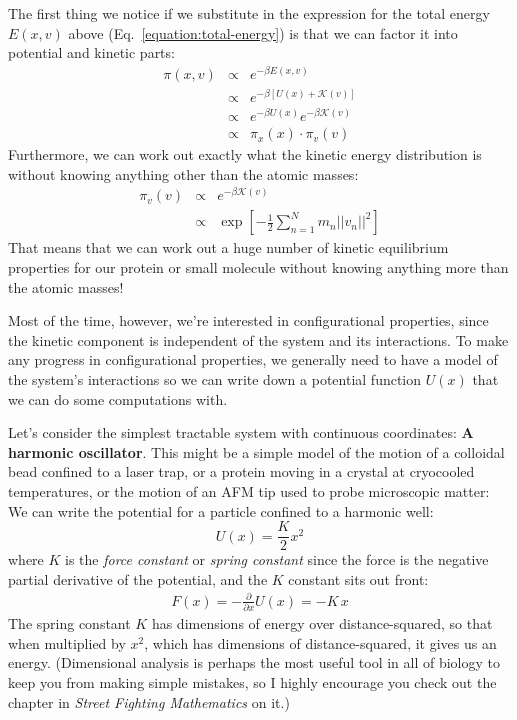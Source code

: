 \documentclass[english,course]{lecture}
\begin{document}
The first thing we notice if we substitute in the expression for the total energy $E(x,v)$ above (Eq.~\ref{equation:total-energy}) is that we can factor it into potential and kinetic parts:
\begin{eqnarray}
\pi(x,v) &\propto& e^{-\beta E(x,v)} \\
&\propto& e^{-\beta [U(x) + \mathcal{K}(v)]} \\
&\propto& e^{-\beta U(x)} e^{-\beta \mathcal{K}(v)} \\
&\propto& \pi_x(x) \cdot \pi_v(v)
\end{eqnarray}
Furthermore, we can work out exactly what the kinetic energy distribution is without knowing anything other than the atomic masses:
\begin{eqnarray}
\pi_v(v) &\propto& e^{-\beta \mathcal{K}(v)} \\
&\propto& \exp\left[-\frac{1}{2} \sum_{n=1}^N m_n ||v_n||^2 \right]
\end{eqnarray}
That means that we can work out a huge number of kinetic equilibrium properties for our protein or small molecule without knowing anything more than the atomic masses!

Most of the time, however, we're interested in configurational properties, since the kinetic component is independent of the system and its interactions.
To make any progress in configurational properties, we generally need to have a model of the system's interactions so we can write down a potential function $U(x)$ that we can do some computations with.

Let's consider the simplest tractable system with continuous coordinates: {\bf A harmonic oscillator}.
This might be a simple model of the motion of a colloidal bead confined to a laser trap, or a protein moving in a crystal at cryocooled temperatures, or the motion of an AFM tip used to probe microscopic matter:
We can write the potential for a particle confined to a harmonic well:
\begin{equation}
U(x) = \frac{K}{2} x^2
\end{equation}
where $K$ is the \emph{force constant} or \emph{spring constant} since the force is the negative partial derivative of the potential, and the $K$ constant sits out front:
\begin{eqnarray}
F(x) = - \frac{\partial}{\partial x} U(x) = - K \, x
\end{eqnarray}
The spring constant $K$ has dimensions of energy over distance-squared, so that when multiplied by $x^2$, which has dimensions of distance-squared, it gives us an energy.
(Dimensional analysis is perhaps the most useful tool in all of biology to keep you from making simple mistakes, so I highly encourage you check out the chapter in \emph{Street Fighting Mathematics} on it.)
\end{document}
